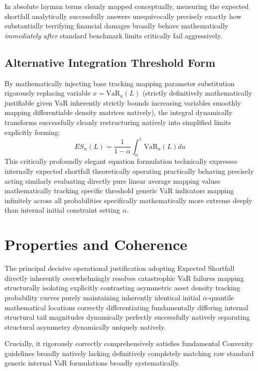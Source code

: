In absolute layman terms cleanly mapped conceptually, measuring the expected shortfall analytically successfully answers unequivocally precisely exactly how substantially terrifying financial damages broadly behave mathematically \textit{immediately after} standard benchmark limits critically fail aggressively.

\subsection{Alternative Integration Threshold Form}

By mathematically injecting base tracking mapping parameter substitution rigorously replacing variable $x = \text{VaR}_u(L)$ (strictly definitively mathematically justifiable given VaR inherently strictly bounds increasing variables smoothly mapping differentiable density matrices natively), the integral dynamically transforms successfully cleanly restructuring natively into simplified limits explicitly forming:
$$
ES_\alpha(L) = \frac{1}{1 - \alpha} \int_\alpha^1 \text{VaR}_u(L) du
$$
This critically profoundly elegant equation formulation technically expresses internally expected shortfall theoretically operating practically behaving precisely acting similarly evaluating directly pure linear average mapping values mathematically tracking specific threshold generic VaR indicators mapping infinitely across all probabilities specifically mathematically more extreme deeply than internal initial constraint setting $\alpha$.

\section{Properties and Coherence}

The principal decisive operational justification adopting Expected Shortfall directly inherently overwhelmingly resolves catastrophic VaR failures mapping structurally isolating explicitly contrasting asymmetric asset density tracking probability curves purely maintaining inherently identical initial $\alpha$-quantile mathematical locations correctly differentiating fundamentally differing internal structural tail magnitudes dynamically perfectly successfully natively separating structural asymmetry dynamically uniquely natively. 

Crucially, it rigorously correctly comprehensively satisfies fundamental Convexity guidelines broadly natively lacking definitively completely matching raw standard generic internal VaR formulations broadly systematically.

